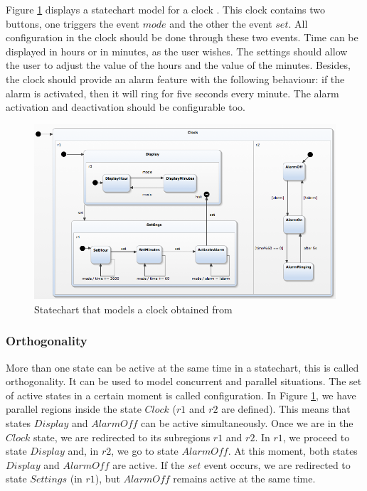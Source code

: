 Figure \ref{fig:stateClock} displays a statechart model for a clock \cite{YakinduVideos}. This clock contains two buttons, one triggers the event $mode$ and the other the event $set$. All configuration in the clock should be done through these two events. Time can be displayed in hours or in minutes, as the user wishes. The settings should allow the user to adjust the value of the hours and the value of the minutes. Besides, the clock should provide an alarm feature with the following behaviour: if the alarm is activated, then it will ring for five seconds every minute. The alarm activation and deactivation should be configurable too.  


\begin{figure}[htb]
\includegraphics[width=1.0\textwidth]{figuras/statechartExample1}
\caption{\label{fig:stateClock}Statechart that models a clock obtained from \cite{YakinduVideos}}
\end{figure}

\subsubsection{Orthogonality}

More than one state can be active at the same time in a statechart, this is called orthogonality. It can be used to model concurrent and parallel situations. The set of active states in a certain moment is called configuration. In Figure \ref{fig:stateClock}, we have parallel regions inside the state $Clock$ ($r1$ and $r2$ are defined). This means that states $Display$ and $AlarmOff$ can be active simultaneously. Once we are in the $Clock$ state, we are redirected to its subregions $r1$ and $r2$. In $r1$, we proceed to state $Display$ and, in $r2$, we go to state $AlarmOff$. At this moment, both states $Display$ and $AlarmOff$ are active. If the $set$ event occurs, we are redirected to state $Settings$ (in $r1$), but $AlarmOff$ remains active at the same time. 

